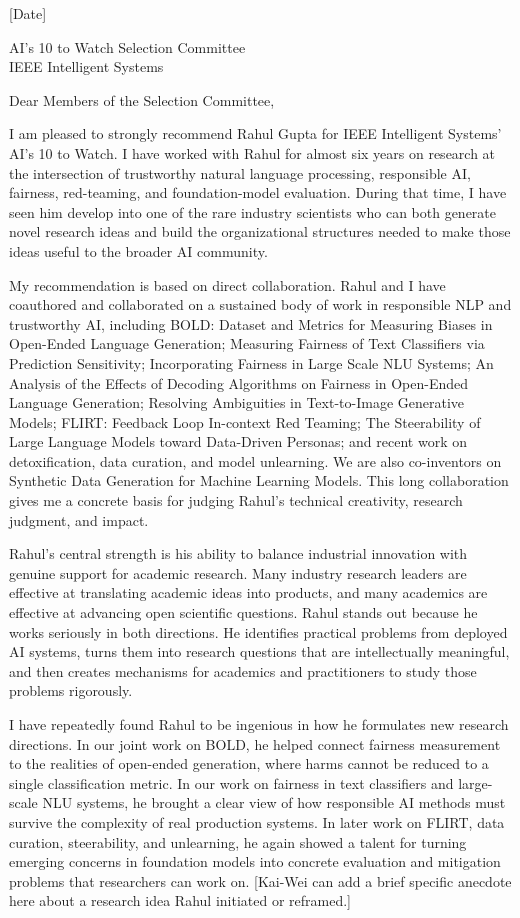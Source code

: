 \documentclass[11pt]{article}
\begin{document}
[Date]

AI's 10 to Watch Selection Committee\\
IEEE Intelligent Systems

Dear Members of the Selection Committee,

I am pleased to strongly recommend Rahul Gupta for IEEE Intelligent Systems' AI's 10 to Watch. I have worked with Rahul for almost six years on research at the intersection of trustworthy natural language processing, responsible AI, fairness, red-teaming, and foundation-model evaluation. During that time, I have seen him develop into one of the rare industry scientists who can both generate novel research ideas and build the organizational structures needed to make those ideas useful to the broader AI community.

My recommendation is based on direct collaboration. Rahul and I have coauthored and collaborated on a sustained body of work in responsible NLP and trustworthy AI, including BOLD: Dataset and Metrics for Measuring Biases in Open-Ended Language Generation; Measuring Fairness of Text Classifiers via Prediction Sensitivity; Incorporating Fairness in Large Scale NLU Systems; An Analysis of the Effects of Decoding Algorithms on Fairness in Open-Ended Language Generation; Resolving Ambiguities in Text-to-Image Generative Models; FLIRT: Feedback Loop In-context Red Teaming; The Steerability of Large Language Models toward Data-Driven Personas; and recent work on detoxification, data curation, and model unlearning. We are also co-inventors on Synthetic Data Generation for Machine Learning Models. This long collaboration gives me a concrete basis for judging Rahul's technical creativity, research judgment, and impact.

Rahul's central strength is his ability to balance industrial innovation with genuine support for academic research. Many industry research leaders are effective at translating academic ideas into products, and many academics are effective at advancing open scientific questions. Rahul stands out because he works seriously in both directions. He identifies practical problems from deployed AI systems, turns them into research questions that are intellectually meaningful, and then creates mechanisms for academics and practitioners to study those problems rigorously.

I have repeatedly found Rahul to be ingenious in how he formulates new research directions. In our joint work on BOLD, he helped connect fairness measurement to the realities of open-ended generation, where harms cannot be reduced to a single classification metric. In our work on fairness in text classifiers and large-scale NLU systems, he brought a clear view of how responsible AI methods must survive the complexity of real production systems. In later work on FLIRT, data curation, steerability, and unlearning, he again showed a talent for turning emerging concerns in foundation models into concrete evaluation and mitigation problems that researchers can work on. [Kai-Wei can add a brief specific anecdote here about a research idea Rahul initiated or reframed.]
\end{document}
